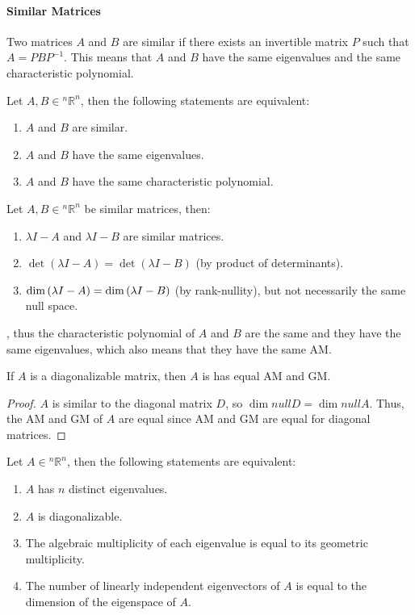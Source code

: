 \documentclass[11pt]{report}
\begin{document}
\paragraph{Similar Matrices} Two matrices $A$ and $B$ are similar if there exists an invertible matrix $P$ such that $A = PBP^{-1}$. This means that $A$ and $B$ have the same eigenvalues and the same characteristic polynomial.
\begin{theorem}
    Let $A, B \in {^n\mathbb{R}^n}$, then the following statements are equivalent:
    \begin{enumerate}
        \item $A$ and $B$ are similar.
        \item $A$ and $B$ have the same eigenvalues.
        \item $A$ and $B$ have the same characteristic polynomial.
    \end{enumerate}
\end{theorem}
\begin{theorem}
    Let $A, B \in {^n\mathbb{R}^n}$ be similar matrices, then:
    \begin{enumerate}
        \item $\lambda I - A$ and $\lambda I - B$ are similar matrices.
        \item $\det(\lambda I - A) = \det(\lambda I - B)$ (by product of determinants).
        \item $\dim \null (\lambda I - A) = \dim \null (\lambda I - B)$ (by rank-nullity), but not necessarily the same null space. 
    \end{enumerate}
    , thus the characteristic polynomial of $A$ and $B$ are the same and they have the same eigenvalues, which also means that they have the same AM.
\end{theorem}
\begin{theorem}
    If $A$ is a diagonalizable matrix, then $A$ is has equal AM and GM.
\end{theorem}
\begin{proof}
    $A$ is similar to the diagonal matrix $D$, so $\dim null D = \dim null A$. Thus, the AM and GM of $A$ are equal since AM and GM are equal for diagonal matrices.
\end{proof}
\begin{theorem}
    Let $A \in {^n\mathbb{R}^n}$, then the following statements are equivalent:
    \begin{enumerate}
        \item $A$ has $n$ distinct eigenvalues.
        \item $A$ is diagonalizable.
        \item The algebraic multiplicity of each eigenvalue is equal to its geometric multiplicity.
        \item The number of linearly independent eigenvectors of $A$ is equal to the dimension of the eigenspace of $A$.
    \end{enumerate}
\end{theorem}
\end{document}

